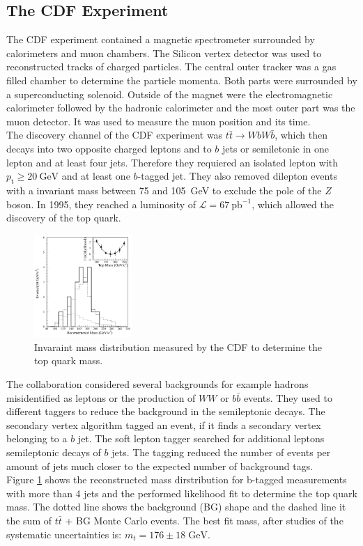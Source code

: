 \subsection{The CDF Experiment}
The CDF experiment contained a magnetic spectrometer surrounded by calorimeters and muon chambers. The Silicon vertex detector was used to reconstructed tracks of charged particles. The central outer tracker was a gas filled chamber to determine the particle momenta. Both parts were surrounded by a superconducting solenoid. Outside of the magnet were the electromagnetic calorimeter followed by the hadronic calorimeter and the most outer part was the muon detector. It was used to measure the muon position and its time.\\
The discovery channel of the CDF experiment was $t\bar{t} \rightarrow WbW\bar{b}$, which then decays into two opposite charged leptons and to $b$ jets or semiletonic in one lepton and at least four jets. Therefore they requiered an isolated lepton with $p_{\text{t}}\geq \SI{20}{\GeV}$ and at least one $b$-tagged jet. They also removed dilepton events with a invariant mass between 75 and \SI{105}{\GeV} to exclude the pole of the $Z$ boson.
In 1995, they reached a luminosity of $\mathcal{L} = \SI{67}{\pico\barn}^{-1}$, which allowed the discovery of the top quark.

\begin{figure}
    \includegraphics[width=0.33\textwidth]{graphics/CDF.png}
    \caption{Invaraint mass distribution measured by the CDF to determine the top quark mass.\cite{top-quark}}
		\label{fig:CDF}
  \end{figure}
  \FloatBarrier
The collaboration considered several backgrounds for example hadrons misidentified as leptons or the production of $WW$ or $b\bar{b}$ events. They used to different taggers to reduce the background in the semileptonic decays. The secondary vertex algorithm tagged an event, if it finds a secondary vertex belonging to a $b$ jet. The soft lepton tagger searched for additional leptons semileptonic decays of $b$ jets. The tagging reduced the number of events per amount of jets much closer to the expected number of background tags.\\
Figure \ref{fig:CDF} shows the reconstructed mass dirstribution for b-tagged measurements with more than 4 jets and the performed likelihood fit to determine the top quark mass. The dotted line shows the background (BG) shape and the dashed line it the sum of $t\bar{t}$ + BG Monte Carlo events.
The best fit mass, after studies of the systematic uncertainties is:
$m_{t} = 176 \pm 18 \;\si{\GeV} $.
